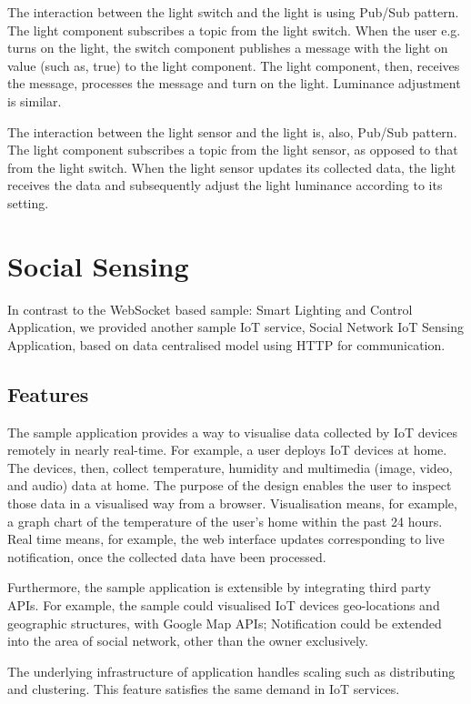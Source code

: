 The interaction between the light switch and the light is using Pub/Sub pattern. The light component subscribes a topic from the light switch. When the user e.g. turns on the light, the switch component publishes a message with the light on value (such as, true) to the light component. The light component, then, receives the message, processes the message and turn on the light. Luminance adjustment is similar.

The interaction between the light sensor and the light is, also, Pub/Sub pattern. The light component subscribes a topic from the light sensor, as opposed to that from the light switch. When the light sensor updates its collected data, the light receives the data and subsequently adjust the light luminance according to its setting.

\section{Social Sensing}
In contrast to the WebSocket based sample: Smart Lighting and Control Application, we provided another sample IoT service, Social Network IoT Sensing Application, based on data centralised model using HTTP for communication. 

\subsection{Features}
The sample application provides a way to visualise data collected by IoT devices remotely in nearly real-time. For example, a user deploys IoT devices at home. The devices, then, collect temperature, humidity and multimedia (image, video, and audio) data at home. The purpose of the design enables the user to inspect those data in a visualised way from a browser. Visualisation means, for example, a graph chart of the temperature of the user's home within the past 24 hours. Real time means, for example, the web interface updates corresponding to live notification, once the collected data have been processed.

Furthermore, the sample application is extensible by integrating third party APIs. For example, the sample could visualised IoT devices geo-locations and geographic structures, with Google Map APIs; Notification could be extended into the area of social network, other than the owner exclusively. 

The underlying infrastructure of application handles scaling such as distributing and clustering. This feature satisfies the same demand in IoT services.

